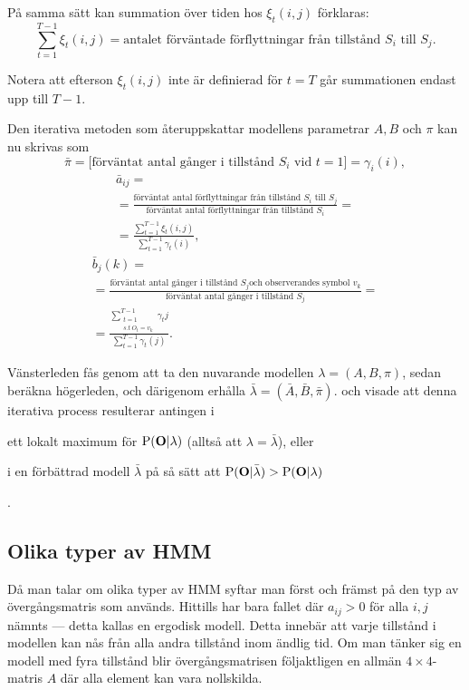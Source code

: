 \documentclass[../rapport_MVEX01-11-05]{subfiles}
\begin{document}
På samma sätt kan summation över tiden hos  $\xi_t(i,j)$ förklaras:
\begin{equation*}
\sum_{t=1}^{T-1}\xi_t(i,j) = \text{antalet förväntade förflyttningar
  från tillstånd $S_i$ till $S_j$}.
\end{equation*}

Notera att efterson $\xi_t(i,j)$ inte är definierad för $t=T$ går summationen 
endast upp till $T -1$. 

Den iterativa metoden som återuppskattar modellens parametrar $A,B$
och $\pi$ kan nu skrivas som
\begin{equation*}
\bar{\pi} = \text{[förväntat antal gånger i tillstånd $S_i$ vid
  $t=1$]} = \gamma_i(i),
\end{equation*}
\begin{multline*}
\bar{a}_{ij} = \\ = \frac{\text{förväntat antal förflyttningar från
    tillstånd $S_i$ till $S_j$}}{\text{förväntat antal förflyttningar
    från tillstånd $S_i$}} = \\ =
\frac{\sum_{t=1}^{T-1}\xi_t(i,j)}{\sum_{t=1}^{T-1}\gamma_t(i)},
\end{multline*}
\begin{multline*}
\bar{b}_j(k) = \\ = \frac{\text{förväntat antal gånger i tillstånd $S_j$
    och observerandes symbol $v_k$}}{\text{förväntat antal gånger i
    tillstånd $S_j$}} = \\ = \frac{\sum_{\substack{t=1\\s.t~ O_t =
      v_k}}^{T-1}\gamma_t{j}}{\sum_{t=1}^{T-1}\gamma_t(j)}.
\end{multline*}

Vänsterleden fås genom att ta den nuvarande modellen $\lambda =
(A,B,\pi)$, sedan beräkna högerleden, och därigenom erhålla $\bar{\lambda} =
(\bar{A},\bar{B}, \bar{\pi})$.  och 
visade att denna iterativa process resulterar antingen i
\begin{inparaenum}
	\item ett lokalt maximum för $\mathrm{P}(\mathbf{O}|\lambda)$
  (alltså att $\lambda = \bar{\lambda}$), eller
 	\item i en förbättrad modell $\bar{\lambda}$ på så sätt att
  $\mathrm{P}(\mathbf{O}|\bar{\lambda}) > \mathrm{P}(\mathbf{O}|\lambda)$
\end{inparaenum}. 

\subsection{Olika typer av HMM}\label{sec:hmmtypes}
Då man talar om olika typer av HMM syftar man först och främst på
den typ av övergångsmatris som används. Hittills har bara 
fallet där $a_{ij} > 0$ för alla $i,j$ nämnts --- detta kallas en ergodisk
modell. Detta innebär att varje tillstånd i modellen
kan nås från alla andra tillstånd inom ändlig tid. Om man
tänker sig en modell med fyra tillstånd blir övergångsmatrisen
följaktligen en allmän $4\times 4$-matris $A$ där alla element kan vara nollskilda.
\end{document}
